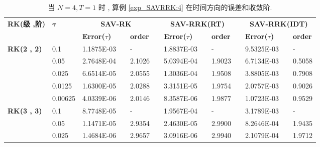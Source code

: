 \begin{table}[H]\scriptsize
\centering
\caption{当 $N=4 , T = 1$ 时 , 算例 \ref{exp_SAVRRK:4}  在时间方向的误差和收敛阶.}
\begin{tabular}{lllllrlrlrlrlrl}
\toprule
\multicolumn{2}{l}{\multirow{2}[3]{*}{\textbf{RK(级 ,阶)}}} & \multicolumn{2}{l}{\multirow{2}[3]{*}{$\bm{\tau}$}} & \multicolumn{3}{c}{\textbf{SAV-RK}} &       & \multicolumn{3}{c}{\textbf{SAV-RRK(RT)}} &       & \multicolumn{3}{c}{\textbf{SAV-RRK(IDT)}} \\
\cmidrule{5-7}\cmidrule{9-11}\cmidrule{13-15}    \multicolumn{2}{l}{} & \multicolumn{2}{l}{} & \textbf{Error($\tau$)} &       & \textbf{order} &       & \textbf{Error($\tau$)} &       & \textbf{order} &       & \textbf{Error($\tau$)} &       & \textbf{order} \\
\hline
\multicolumn{2}{l}{\multirow{5}[0]{*}{\textbf{RK(2 , 2)}}} & \multicolumn{2}{l}{0.1} & 1.1875E-03 &       & -     &       & 1.8837E-03 &       & -     &       & 9.5325E-03 &       & - \\
\multicolumn{2}{l}{} & \multicolumn{2}{l}{0.05} & 2.7648E-04 &       & 2.1026  &       & 5.0394E-04 &       & 1.9023  &       & 6.7134E-03 &       & 0.5058  \\
\multicolumn{2}{l}{} & \multicolumn{2}{l}{0.025} & 6.6514E-05 &       & 2.0555  &       & 1.3036E-04 &       & 1.9508  &       & 3.8805E-03 &       & 0.7908  \\
\multicolumn{2}{l}{} & \multicolumn{2}{l}{0.0125} & 1.6300E-05 &       & 2.0288  &       & 3.3151E-05 &       & 1.9754  &       & 2.0757E-03 &       & 0.9026  \\
\multicolumn{2}{l}{} & \multicolumn{2}{l}{0.00625} & 4.0339E-06 &       & 2.0146  &       & 8.3587E-06 &       & 1.9877  &       & 1.0723E-03 &       & 0.9529  \\
\multicolumn{2}{l}{\multirow{5}[0]{*}{\textbf{RK(3 , 3)}}} & \multicolumn{2}{l}{0.1} & 8.7748E-05 &       & -     &       & 1.9567E-04 &       & -     &       & 3.1789E-03 &       & - \\
\multicolumn{2}{l}{} & \multicolumn{2}{l}{0.05} & 1.1471E-05 &       & 2.9354  &       & 2.4630E-05 &       & 2.9900  &       & 8.2646E-04 &       & 1.9435  \\
\multicolumn{2}{l}{} & \multicolumn{2}{l}{0.025} & 1.4684E-06 &       & 2.9657  &       & 3.0916E-06 &       & 2.9940  &       & 2.1079E-04 &       & 1.9712  \\

\end{tabular}
\end{table}
